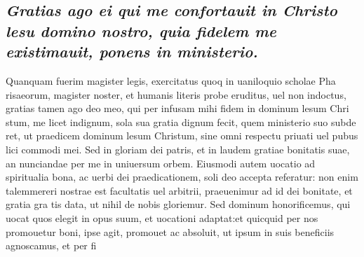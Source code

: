 \documentclass{article}
\begin{document}
\begin{pages}
\subsection*{\textit{Gratias ago ei qui me confortauit in Christo lesu domino nostro, quia fidelem me existimauit, ponens in ministerio. }}\pstart Quanquam fuerim magister legis, exercitatus quoq in uaniloquio scholae Pha risaeorum, magister noster, et humanis literis probe eruditus, uel non indoctus, gratias tamen ago deo meo, qui per infusam mihi fidem in dominum lesum Chri stum, me licet indignum, sola sua gratia dignum fecit, quem ministerio suo subde ret, ut praedicem dominum lesum Christum, sine omni respectu priuati uel pubus  lici commodi mei. Sed in gloriam dei patris, et in laudem gratiae bonitatis suae, an nunciandae per me in uniuersum orbem. Eiusmodi autem uocatio ad spiritualia bona, ac uerbi dei praedicationem, soli deo accepta referatur: non enim talemmereri nostrae est facultatis uel arbitrii, praeuenimur ad id dei bonitate, et gratia gra tis data, ut nihil de nobis gloriemur. Sed dominum honorificemus, qui uocat quos elegit in opus suum, et uocationi adaptat:et quicquid per nos promouetur boni, ipse agit, promouet ac absoluit, ut ipsum in suis beneficiis agnoscamus, et per fi\pend

\end{pages}
\end{document}
